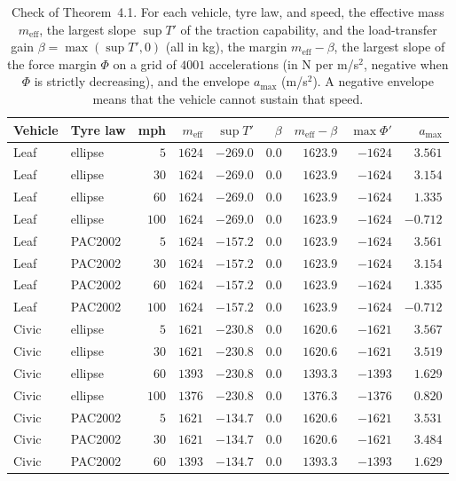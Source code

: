 \documentclass[12pt, twoside]{amsart}
\theoremstyle{definition}
\newcommand{\amax}{a_{\max}}
\newcommand{\meff}{m_{\mathrm{eff}}}
\newcommand{\mainref}[2]{#2}
\begin{document}
\begin{table}[htbp]
\centering\small
\caption{Check of Theorem~\mainref{thm:wellposed}{4.1}. For each vehicle, tyre law, and speed, the effective mass $\meff$, the largest slope $\sup T'$ of the traction capability, and the load-transfer gain $\beta=\max(\sup T',0)$ (all in kg), the margin $\meff-\beta$, the largest slope of the force margin $\Phi$ on a grid of $4001$ accelerations (in N per m/s$^2$, negative when $\Phi$ is strictly decreasing), and the envelope $\amax$ (m/s$^2$). A negative envelope means that the vehicle cannot sustain that speed.}\label{tab:app-wellposed}
\begin{tabular}{llrrrrrrr}
\toprule
Vehicle & Tyre law & mph & $\meff$ & $\sup T'$ & $\beta$ & $\meff-\beta$ & $\max\Phi'$ & $\amax$\\
\midrule
Leaf & ellipse & $5$ & $1624$ & $-269.0$ & $0.0$ & $1623.9$ & $-1624$ & $3.561$\\
Leaf & ellipse & $30$ & $1624$ & $-269.0$ & $0.0$ & $1623.9$ & $-1624$ & $3.154$\\
Leaf & ellipse & $60$ & $1624$ & $-269.0$ & $0.0$ & $1623.9$ & $-1624$ & $1.335$\\
Leaf & ellipse & $100$ & $1624$ & $-269.0$ & $0.0$ & $1623.9$ & $-1624$ & $-0.712$\\
Leaf & PAC2002 & $5$ & $1624$ & $-157.2$ & $0.0$ & $1623.9$ & $-1624$ & $3.561$\\
Leaf & PAC2002 & $30$ & $1624$ & $-157.2$ & $0.0$ & $1623.9$ & $-1624$ & $3.154$\\
Leaf & PAC2002 & $60$ & $1624$ & $-157.2$ & $0.0$ & $1623.9$ & $-1624$ & $1.335$\\
Leaf & PAC2002 & $100$ & $1624$ & $-157.2$ & $0.0$ & $1623.9$ & $-1624$ & $-0.712$\\
Civic & ellipse & $5$ & $1621$ & $-230.8$ & $0.0$ & $1620.6$ & $-1621$ & $3.567$\\
Civic & ellipse & $30$ & $1621$ & $-230.8$ & $0.0$ & $1620.6$ & $-1621$ & $3.519$\\
Civic & ellipse & $60$ & $1393$ & $-230.8$ & $0.0$ & $1393.3$ & $-1393$ & $1.629$\\
Civic & ellipse & $100$ & $1376$ & $-230.8$ & $0.0$ & $1376.3$ & $-1376$ & $0.820$\\
Civic & PAC2002 & $5$ & $1621$ & $-134.7$ & $0.0$ & $1620.6$ & $-1621$ & $3.531$\\
Civic & PAC2002 & $30$ & $1621$ & $-134.7$ & $0.0$ & $1620.6$ & $-1621$ & $3.484$\\
Civic & PAC2002 & $60$ & $1393$ & $-134.7$ & $0.0$ & $1393.3$ & $-1393$ & $1.629$\\

\end{tabular}
\end{table}
\end{document}

